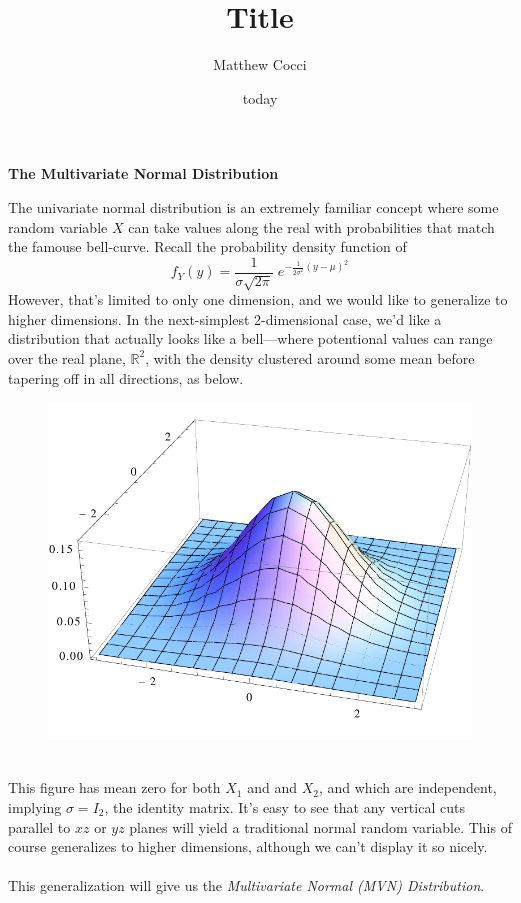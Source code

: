 \documentclass[a4paper,12pt]{scrartcl}
\author{Matthew Cocci}
\title{Title}
\date{today}
\begin{document}
\begin{center} \LARGE \bf
   The Multivariate Normal Distribution
\end{center}

The univariate normal distribution is an extremely familiar concept
where some random variable $X$ can take values along the real with 
probabilities that match the famouse bell-curve. Recall 
the probability density function of
   \[ f_Y(y) = \frac{1}{\sigma \sqrt{2\pi}} \; e^{-\frac{1}{2\sigma^2}
      (y - \mu)^2} \]
However, that's 
limited to only one dimension, and we would like to generalize to 
higher dimensions. In the next-simplest
2-dimensional case, we'd like a distribution
that actually looks like a bell---where potentional values can
range over the real plane, $\mathbb{R}^2$, with the density
clustered around some mean before tapering off in all directions, 
as below.
\begin{figure}[h!]
   \centering
   \includegraphics[scale=0.40]{multivariate.pdf}
\end{figure}
\\
This figure has mean zero for both $X_1$ and and $X_2$, and 
which are independent, implying $\sigma = I_2$, the identity matrix. 
It's easy to see that any vertical cuts parallel to $xz$ or $yz$ planes
will yield a traditional normal random variable. This of course 
generalizes to higher dimensions, although we can't display it so nicely.
\\
\\
This generalization will give us the 
\emph{Multivariate Normal (MVN) Distribution}. 
\end{document}
